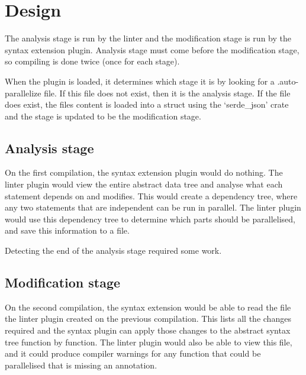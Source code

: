 \documentclass[conference]{IEEEtran}
\begin{document}
\section{Design}
The analysis stage is run by the linter and the modification stage is run by the syntax extension plugin. Analysis stage must come before the modification stage, so compiling is done twice (once for each stage).

When the plugin is loaded, it determines which stage it is by looking for a .auto-parallelize file. If this file does not exist, then it is the analysis stage. If the file does exist, the files content is loaded into a struct using the `serde\_json' crate and the stage is updated to be the modification stage.

\subsection{Analysis stage}
On the first compilation, the syntax extension plugin would do nothing. The linter plugin would view the entire abstract data tree and analyse what each statement depends on and modifies. This would create a dependency tree, where any two statements that are independent can be run in parallel. The linter plugin would use this dependency tree to determine which parts should be parallelised, and save this information to a file.

Detecting the end of the analysis stage required some work.

\subsection{Modification stage}
On the second compilation, the syntax extension would be able to read the file the linter plugin created on the previous compilation. This lists all the changes required and the syntax plugin can apply those changes to the abstract syntax tree function by function. The linter plugin would also be able to view this file, and it could produce compiler warnings for any function that could be parallelised that is missing an annotation.


\printbibliography
\end{document}
